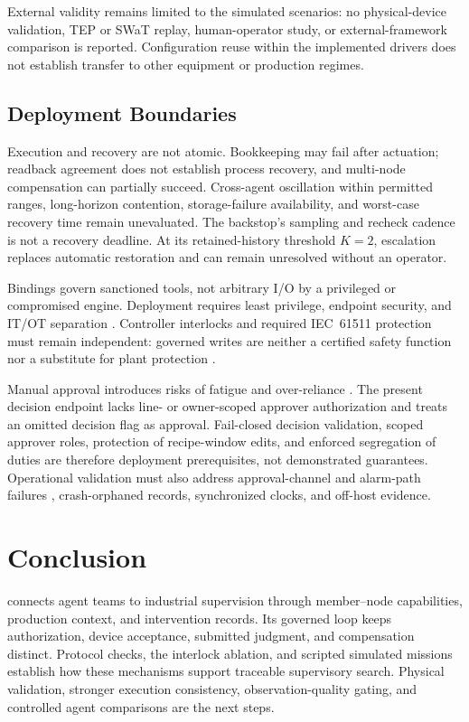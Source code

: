 External validity remains limited to the simulated scenarios: no
physical-device validation, TEP or SWaT replay, human-operator study, or
external-framework comparison is reported. Configuration reuse within the
implemented drivers does not establish transfer to other equipment or
production regimes.

\subsection{Deployment Boundaries}
Execution and recovery are not atomic. Bookkeeping may fail after actuation;
readback agreement does not establish process recovery, and multi-node
compensation can partially succeed. Cross-agent oscillation within permitted
ranges, long-horizon contention, storage-failure availability, and worst-case
recovery time remain unevaluated. The backstop's sampling and recheck cadence
is not a recovery deadline. At its retained-history threshold $K=2$,
escalation replaces automatic restoration and can remain unresolved without
an operator.

Bindings govern sanctioned tools, not arbitrary I/O by a privileged or
compromised engine. Deployment requires least privilege, endpoint security,
and IT/OT separation \cite{iec62443-3-3,nist80082}. Controller interlocks and
required IEC~61511 protection must remain independent: governed writes are
neither a certified safety function nor a substitute for plant protection
\cite{iec61511}.

Manual approval introduces risks of fatigue and over-reliance
\cite{parasuraman2000model,bainbridge1983ironies,leesee2004trust,parasuramanmanzey2010complacency}.
The present decision endpoint lacks line- or owner-scoped approver
authorization and treats an omitted decision flag as approval. Fail-closed
decision validation, scoped approver roles, protection of recipe-window edits,
and enforced segregation of duties are therefore deployment prerequisites,
not demonstrated guarantees. Operational validation must also address
approval-channel and alarm-path failures \cite{eemua191}, crash-orphaned
records, synchronized clocks, and off-host evidence.

\section{Conclusion}
\label{sec:conclusion}
\system{} connects agent teams to industrial supervision through member--node
capabilities, production context, and intervention records. Its governed loop
keeps authorization, device acceptance, submitted judgment, and compensation
distinct. Protocol checks, the interlock ablation, and scripted simulated
missions establish how these mechanisms support traceable supervisory search.
Physical validation, stronger execution consistency, observation-quality
gating, and controlled agent comparisons are the next steps.

